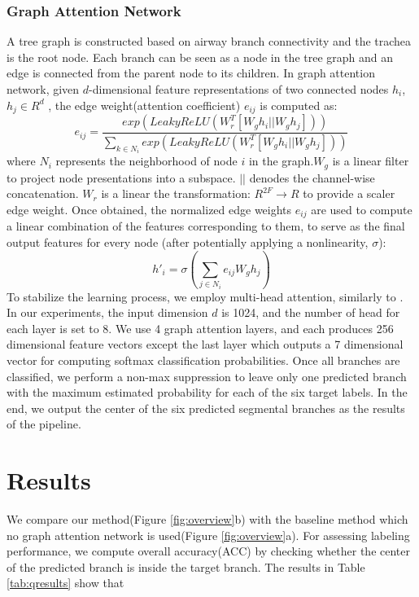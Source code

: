 \documentclass{midl} %
\begin{document}
\subsubsection{Graph Attention Network}
A tree graph is constructed based on airway branch connectivity and the trachea is the root node. Each branch can be seen as a node in the tree graph and an edge is connected from the parent node to its children. In graph attention network, given $d$-dimensional feature representations of two connected nodes $h_{i}$, $h_{j} \in R^d$ , the edge weight(attention coefficient) $e_{ij}$ is computed as:
\begin{equation}\label{edge-weight}
    e_{ij} = \frac{exp(LeakyReLU(W_{r}^T[W_{g}h_{i}||W_{g}h_{j}]))}{\sum_{k \in N_{i}}exp(LeakyReLU(W_{r}^T[W_{g}h_{i}||W_{g}h_{j}]))}
\end{equation}
where $N_{i}$ represents the neighborhood of node $i$ in the graph.$W_{g}$ is a linear filter to project node presentations into a subspace. $||$ denodes the channel-wise concatenation. $W_{r}$ is a linear the transformation: $R^{2F} \rightarrow R$ to provide a scaler edge weight.
Once obtained, the normalized edge weights $e_{ij}$ are used to compute a linear combination of the features corresponding to them, to serve as the final output features for every node (after potentially applying a nonlinearity, $\sigma$):
\begin{equation}\label{edge-weight}
    h'_{i} = \sigma(\sum_{j \in N_{i}}e_{ij}W_{g}h_{j})
\end{equation}
To stabilize the learning process, we employ multi-head attention, similarly to \cite{vaswani2017attention}. 
In our experiments, the input dimension $d$ is 1024, and the number of head for each layer is set to 8. We use 4 graph attention layers, and each produces 256 dimensional feature vectors except the last layer which outputs a 7 dimensional vector for computing softmax classification probabilities.
Once all branches are classified, we perform a non-max suppression to leave only one predicted branch with the maximum estimated probability for each of the six target labels.  In the end, we output the center of the six predicted segmental branches as the results of the pipeline.  
\section{Results}
We compare our method(Figure \ref{fig:overview}b) with the baseline method which no graph attention network is used(Figure \ref{fig:overview}a). For assessing labeling performance, we compute overall accuracy(ACC) by checking whether the center of the predicted branch is inside the target branch. The results in Table \ref{tab:qresults} show that 
\end{document}
